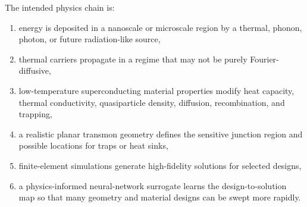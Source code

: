 \documentclass[11pt]{article}
\begin{document}
The intended physics chain is:
\begin{enumerate}[leftmargin=1.6em]
    \item energy is deposited in a nanoscale or microscale region by a thermal, phonon, photon, or future radiation-like source,
    \item thermal carriers propagate in a regime that may not be purely Fourier-diffusive,
    \item low-temperature superconducting material properties modify heat capacity, thermal conductivity, quasiparticle density, diffusion, recombination, and trapping,
    \item a realistic planar transmon geometry defines the sensitive junction region and possible locations for traps or heat sinks,
    \item finite-element simulations generate high-fidelity solutions for selected designs,
    \item a physics-informed neural-network surrogate learns the design-to-solution map so that many geometry and material designs can be swept more rapidly.
\end{enumerate}
\end{document}
